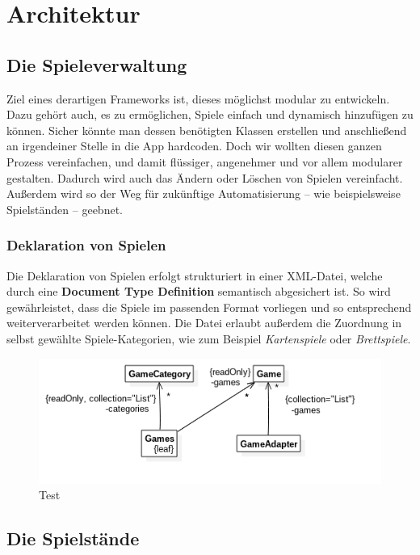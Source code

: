 \chapter{Architektur}

\section{Die Spieleverwaltung}
\sectionauthor{\frank}

Ziel eines derartigen Frameworks ist, dieses möglichst modular  zu entwickeln. Dazu gehört auch, es zu ermöglichen, Spiele einfach
und dynamisch hinzufügen zu können. Sicher könnte man dessen benötigten Klassen
erstellen und anschließend an irgendeiner Stelle in die App hardcoden. Doch wir
wollten diesen ganzen Prozess vereinfachen, und damit flüssiger, angenehmer und
vor allem modularer gestalten. Dadurch wird auch das Ändern oder Löschen von
Spielen vereinfacht. Außerdem wird so der Weg für zukünftige Automatisierung --
wie beispielsweise Spielständen -- geebnet.

\subsection{Deklaration von Spielen}

Die Deklaration von Spielen erfolgt strukturiert in einer XML-Datei, welche
durch eine \textbf{Document Type Definition} semantisch abgesichert ist. So
wird gewährleistet, dass die Spiele im passenden Format vorliegen und so
entsprechend weiterverarbeitet werden können. Die Datei erlaubt außerdem die
Zuordnung in selbst gewählte Spiele-Kategorien, wie zum Beispiel
\emph{Kartenspiele} oder \emph{Brettspiele}.

\begin{figure}[h]
	\centering
	\includegraphics{resources/gamemanager/gamemanager_uml}
	\caption{Test}
	\label{fig:gm_uml}
\end{figure}

\section{Die Spielstände}
\sectionauthor{\leonard}

